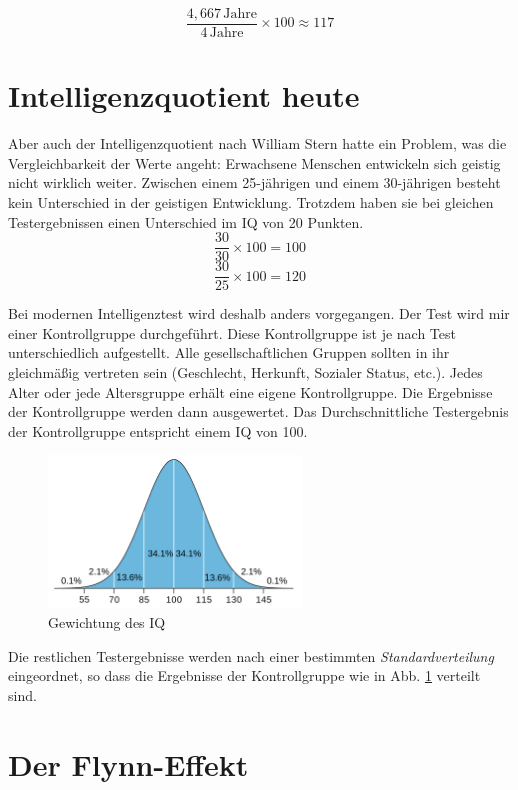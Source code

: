 $$ \frac{4,667\,\mathrm{Jahre}}{4\,\mathrm{Jahre}} \times 100 \approx 117 $$

\section{Intelligenzquotient heute}
Aber auch der Intelligenzquotient nach William Stern hatte ein Problem, was die Vergleichbarkeit der Werte angeht: Erwachsene Menschen entwickeln sich geistig nicht wirklich weiter. Zwischen einem 25-jährigen und einem 30-jährigen besteht kein Unterschied in der geistigen Entwicklung. Trotzdem haben sie bei gleichen Testergebnissen einen Unterschied im IQ von 20 Punkten.
$$ \frac{30}{30} \times 100 = 100 $$
$$ \frac{30}{25} \times 100 = 120 $$

Bei modernen Intelligenztest wird deshalb anders vorgegangen. Der Test wird mir einer Kontrollgruppe durchgeführt. Diese Kontrollgruppe ist je nach Test unterschiedlich aufgestellt. Alle gesellschaftlichen Gruppen sollten in ihr gleichmäßig vertreten sein (Geschlecht, Herkunft, Sozialer Status, etc.). Jedes Alter oder jede Altersgruppe erhält eine eigene Kontrollgruppe. Die Ergebnisse der Kontrollgruppe werden dann ausgewertet. Das Durchschnittliche Testergebnis der Kontrollgruppe entspricht einem IQ von 100.

\begin{figure}[H]
  \centering
  \includegraphics[width=0.6\textwidth]{img/IQ_distribution.png}
  \caption{Gewichtung des IQ \cite{wiki_img_iq}}
  \label{fig:iq}
\end{figure}

Die restlichen Testergebnisse werden nach einer bestimmten \emph{Standardverteilung} eingeordnet, so dass die Ergebnisse der Kontrollgruppe wie in Abb. \ref{fig:iq} verteilt sind.

\section{Der Flynn-Effekt}
\label{sec:flynn}

